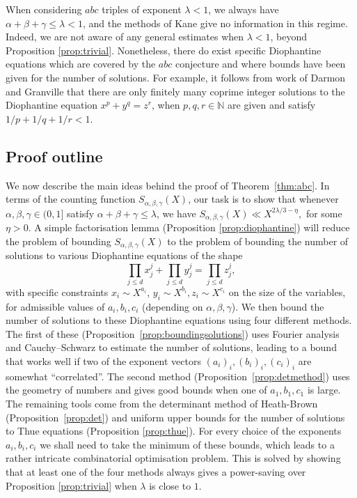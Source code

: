 When considering $abc$ triples of exponent $\lambda<1$, we always have $\alpha+\beta+\gamma\leq \lambda< 1$, and  the methods of Kane give no information
in this regime. Indeed, we are not aware of any general estimates when $\lambda<1$,
 beyond  Proposition \ref{prop:trivial}. Nonetheless, there do exist    specific Diophantine equations which are covered by the $abc$ conjecture and where bounds have been given for the number of solutions.
For example, it follows from work of Darmon and
Granville \cite{DG} that there are only finitely many coprime integer solutions to the Diophantine equation $x^p+y^q=z^r$, when $p,q,r\in \mathbb{N}$ are given and satisfy $1/p+1/q+1/r<1$.


\subsection*{Proof outline} We now describe the main ideas behind  the proof of Theorem~\ref{thm:abc}. In terms of the counting function $S_{\alpha,\beta,\gamma}(X)$, our task is to show that whenever $\alpha,\beta,\gamma\in (0,1]$ satisfy $\alpha+\beta+\gamma\leq \lambda$, we have
$
S_{\alpha,\beta,\gamma}(X)\ll X^{2\lambda/3-\eta},
$
for some $\eta>0$.
A simple factorisation lemma (Proposition \ref{prop:diophantine}) will  reduce the problem of bounding $S_{\alpha,\beta,\gamma}(X)$ to the problem of bounding the number of solutions to various Diophantine equations of the shape
$$
\prod_{j\leq d}x_j^j+\prod_{j\leq d}y_j^j=\prod_{j\leq d}z_j^j ,
$$
with specific constraints $x_i\sim X^{a_i}$, $y_i\sim X^{b_i}, z_i\sim X^{c_i}$ on the size of the variables, for admissible values of $a_i,b_i,c_i$ (depending on $\alpha,\beta,\gamma$).
We then bound the number of solutions to these Diophantine equations using four different methods.  The first of these (Proposition~\ref{prop:boundingsolutions}) uses Fourier analysis and Cauchy--Schwarz to estimate the number of solutions, leading to a bound that works well if two of the exponent vectors $(a_i)_i,(b_i)_i,(c_i)_i$ are somewhat ``correlated''. The second method (Proposition~\ref{prop:detmethod}) uses the geometry of numbers and gives good bounds when
one of $a_1,b_1,c_1$ is large. The remaining tools come from the determinant method of Heath-Brown (Proposition~\ref{prop:det}) and
uniform upper bounds for the number of solutions to Thue equations (Proposition
\ref{prop:thue}).
For every choice of the exponents $a_i,b_i,c_i$ we shall need to take the minimum of these bounds, which leads  to a rather intricate combinatorial optimisation problem. This is solved by
showing that at least one of the four  methods  always gives a power-saving over Proposition
\ref{prop:trivial}
when $\lambda$ is close to $1$.


